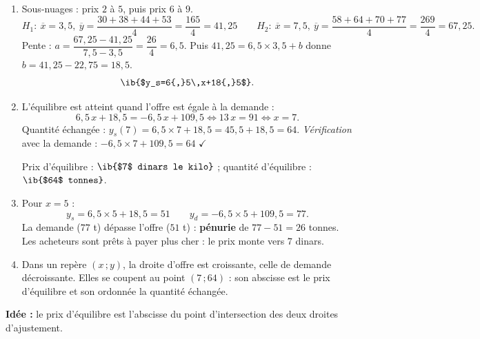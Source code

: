 \begin{enumerate}
  \item Sous-nuages : prix $2$ à $5$, puis prix $6$ à $9$.
  $$H_1:\ \overline{x}=3{,}5,\ \overline{y}=\frac{30+38+44+53}4=\frac{165}4=41{,}25\qquad
  H_2:\ \overline{x}=7{,}5,\ \overline{y}=\frac{58+64+70+77}4=\frac{269}4=67{,}25.$$
  Pente : $a=\dfrac{67{,}25-41{,}25}{7{,}5-3{,}5}=\dfrac{26}4=6{,}5$. Puis $41{,}25=6{,}5\times3{,}5+b$ donne $b=41{,}25-22{,}75=18{,}5$.
  $$ \ib{$y_s=6{,}5\,x+18{,}5$}.$$
  \item L'équilibre est atteint quand l'offre est égale à la demande :
  $$6{,}5\,x+18{,}5=-6{,}5\,x+109{,}5\iff13\,x=91\iff x=7.$$
  Quantité échangée : $y_s(7)=6{,}5\times7+18{,}5=45{,}5+18{,}5=64$. \emph{Vérification} avec la demande : $-6{,}5\times7+109{,}5=64$ $\checkmark$

  Prix d'équilibre : $\ib{$7$ dinars le kilo}$ ; quantité d'équilibre : $\ib{$64$ tonnes}$.
  \item Pour $x=5$ :
  $$y_s=6{,}5\times5+18{,}5=51\qquad y_d=-6{,}5\times5+109{,}5=77.$$
  La demande ($77$ t) dépasse l'offre ($51$ t) : \textbf{pénurie} de $77-51=26$ tonnes. Les acheteurs sont prêts à payer plus cher : le prix monte vers $7$ dinars.
  \item Dans un repère $(x\,;y)$, la droite d'offre est croissante, celle de demande décroissante. Elles se coupent au point $(7\,;64)$ : son abscisse est le prix d'équilibre et son ordonnée la quantité échangée.
\end{enumerate}

\textbf{Idée :} le prix d'équilibre est l'abscisse du point d'intersection des deux droites d'ajustement.
